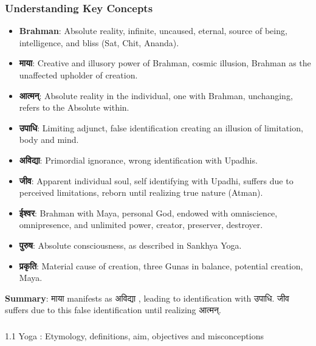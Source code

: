 \begin{frame}[fragile]\frametitle{Understanding Key Concepts}
      \begin{itemize}
        \item \textbf{Brahman}: Absolute reality, infinite, uncaused, eternal, source of being, intelligence, and bliss (Sat, Chit, Ananda).
        \item \textbf{माया}: Creative and illusory power of Brahman, cosmic illusion, Brahman as the unaffected upholder of creation.
        \item \textbf{आत्मन्}: Absolute reality in the individual, one with Brahman, unchanging, refers to the Absolute within.
        \item \textbf{उपाधि}: Limiting adjunct, false identification creating an illusion of limitation, body and mind.
        \item \textbf{अविद्या}: Primordial ignorance, wrong identification with Upadhis.
        \item \textbf{जीव}: Apparent individual soul, self identifying with Upadhi, suffers due to perceived limitations, reborn until realizing true nature (Atman).
        \item \textbf{ईश्वर}: Brahman with Maya, personal God, endowed with omniscience, omnipresence, and unlimited power, creator, preserver, destroyer.
        \item \textbf{पुरुष}: Absolute consciousness, as described in Sankhya Yoga.
        \item \textbf{प्रकृति}: Material cause of creation, three Gunas in balance, potential creation, Maya.
      \end{itemize}
	  
\textbf{Summary}: माया manifests as अविद्या , leading to identification with उपाधि. जीव suffers due to this false identification until realizing आत्मन्.	  
\end{frame}



\begin{frame}[fragile]\frametitle{}
\begin{center}
{\Large 1.1 Yoga : Etymology, definitions, aim, objectives and misconceptions}
\end{center}
\end{frame}

